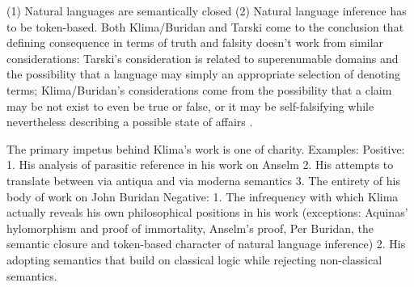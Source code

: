 \documentclass[]{article}
\begin{document}


(1) Natural languages are semantically closed (2) Natural language inference has to be token-based.
Both Klima/Buridan and Tarski come to the conclusion that defining consequence in terms of truth and falsity doesn't work from similar considerations: Tarski's consideration is related to superenumable domains and the possibility that a language may simply an appropriate selection of denoting terms; Klima/Buridan's considerations come from the possibility that a claim may be not exist to even be true or false, or it may be self-falsifying while nevertheless describing a possible state of affairs \autocite[96]{Klima2004}.

The primary impetus behind Klima's work is one of charity.
Examples: 
Positive:
1. His analysis of parasitic reference in his work on Anselm
2. His attempts to translate between via antiqua and via moderna semantics
3. The entirety of his body of work on John Buridan
Negative:
1. The infrequency with which Klima actually reveals his own philosophical positions in his work (exceptions: 
Aquinas' hylomorphism and proof of immortality, 
Anselm's proof, 
Per Buridan, the semantic closure and token-based character of natural language inference)
2. His adopting semantics that build on classical logic while rejecting non-classical semantics.



\end{document}
